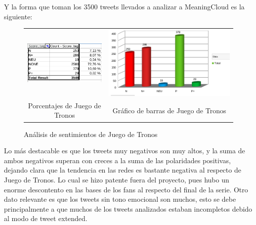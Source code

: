 Y la forma que toman los 3500 tweets llevados a analizar a MeaningCloud es la siguiente:

\begin{figure}[H]
	\centering
	\begin{tabular}{c c}
		
		\includegraphics[scale=.6]{imagenes/porcentajeJdT.png}
		&  \includegraphics[scale=.4]{imagenes/barraJdt.png} \\ 
		
		{Porcentajes de Juego de Tronos}
		
		&  {Gráfico de barras de Juego de Tronos} \\ 
		
	\end{tabular} 
	\caption{Análisis de sentimientos de Juego de Tronos}
	\label{fig:HBOAll}
\end{figure}

Lo más destacable es que los tweets muy negativos son muy altos, y la suma de ambos negativos superan con creces a la suma de las polaridades positivas, dejando clara que la tendencia en las redes es bastante negativa al respecto de Juego de Tronos. Lo cual se hizo patente fuera del proyecto, pues hubo un enorme descontento en las bases de los fans al respecto del final de la serie. Otro dato relevante es que los tweets sin tono emocional son muchos, esto se debe principalmente a que muchos de los tweets analizados estaban incompletos debido al modo de tweet extended. 
